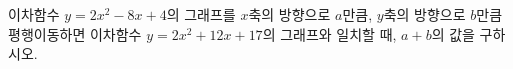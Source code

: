 이차함수 $y=2x^2-8x+4$의 그래프를 $x$축의 방향으로 $a$만큼, $y$축의 방향으로 $b$만큼 평행이동하면 이차함수 $y=2x^2+12x+17$의 그래프와 일치할 때, $a+b$의 값을 구하시오.

